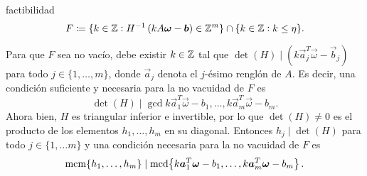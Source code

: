 factibilidad
\begin{equation}
	\label{eq:feas-set}
	F \coloneq \lbrace k \in \mathbb{Z} \vcentcolon H^{-1}\left(kA\boldsymbol{\omega} - \boldsymbol{b}\right) \in \mathbb{Z}^m \rbrace
	\cap \lbrace k \in \mathbb{Z} \vcentcolon k \leq \eta \rbrace.
\end{equation}
\begin{observation}
	Para que $F$ sea no vacío, debe existir $k \in \mathbb{Z}$ tal que $\det(H) \mid (k\vec{a}_j^T
	\vec{\omega} - \vec{b}_j)$ para todo $j \in \lbrace 1, \ldots, m \rbrace$, donde $\vec{a}_j$
	denota el $j$-ésimo renglón de $A$. Es decir, una condición suficiente y necesaria para la no
	vacuidad de $F$ es
	\begin{equation*}
		\det(H) \mid \gcd{k\vec{a}_1^T\vec{\omega} - b_1, \ldots, k\vec{a}_m^T\vec{\omega} - b_m}.
	\end{equation*}
	Ahora bien, $H$ es triangular inferior e invertible, por lo que $\det(H) \neq 0$ es el producto
	de los elementos $h_1, \ldots, h_m$ en su diagonal. Entonces $h_j \mid \det(H)$ para todo $j \in
	\lbrace 1, \ldots m \rbrace$ y una condición necesaria para la no vacuidad de $F$ es
	\begin{equation*}
		\mathop{\mathrm{mcm}{\left\lbrace h_1, \ldots, h_m \right\rbrace}} \mid \mathop{\mathrm{mcd}{\left\lbrace k\boldsymbol{a}_1^T\boldsymbol{\omega} - b_1, \ldots, k\boldsymbol{a}_m^T\boldsymbol{\omega} - b_m \right\rbrace}}.
	\end{equation*}
\end{observation}

